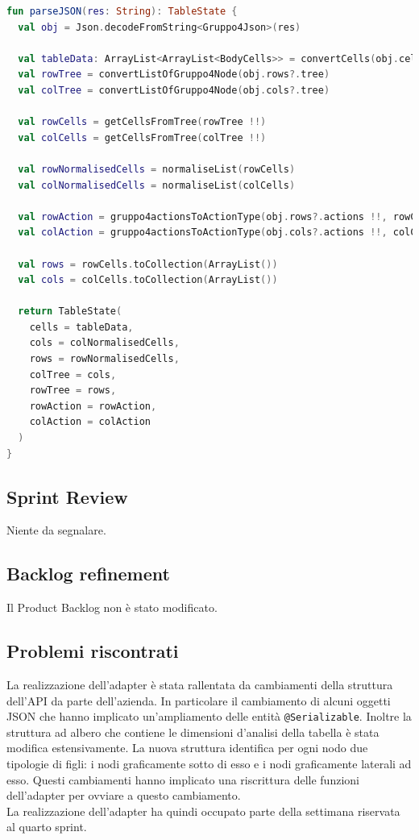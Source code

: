 \begin{lstlisting}[caption={Funzione parseJSON()}, label={lst:bodycells}, language=Kotlin]
fun parseJSON(res: String): TableState {
  val obj = Json.decodeFromString<Gruppo4Json>(res)

  val tableData: ArrayList<ArrayList<BodyCells>> = convertCells(obj.cells, obj.rows?.paths, obj.cols?.paths)!!
  val rowTree = convertListOfGruppo4Node(obj.rows?.tree)
  val colTree = convertListOfGruppo4Node(obj.cols?.tree)

  val rowCells = getCellsFromTree(rowTree !!)
  val colCells = getCellsFromTree(colTree !!)

  val rowNormalisedCells = normaliseList(rowCells)
  val colNormalisedCells = normaliseList(colCells)

  val rowAction = gruppo4actionsToActionType(obj.rows?.actions !!, rowCells.groupBy { it?.level }.size)
  val colAction = gruppo4actionsToActionType(obj.cols?.actions !!, colCells.groupBy { it?.level }.size)

  val rows = rowCells.toCollection(ArrayList())
  val cols = colCells.toCollection(ArrayList())

  return TableState(
    cells = tableData,
    cols = colNormalisedCells,
    rows = rowNormalisedCells,
    colTree = cols,
    rowTree = rows,
    rowAction = rowAction,
    colAction = colAction
  )
}
\end{lstlisting}

\subsection{Sprint Review}
Niente da segnalare.

\subsection{Backlog refinement}
Il Product Backlog non è stato modificato.

\subsection{Problemi riscontrati}
La realizzazione dell'adapter è stata rallentata da cambiamenti della struttura dell'API da parte dell'azienda. In particolare il cambiamento di alcuni oggetti JSON che hanno implicato un'ampliamento delle entità \verb|@Serializable|. Inoltre la struttura ad albero che contiene le dimensioni d'analisi della tabella è stata modifica estensivamente. La nuova struttura identifica per ogni nodo due tipologie di figli: i nodi graficamente sotto di esso e i nodi graficamente laterali ad esso. Questi cambiamenti hanno implicato una riscrittura delle funzioni dell'adapter per ovviare a questo cambiamento. \\
La realizzazione dell'adapter ha quindi occupato parte della settimana riservata al quarto sprint.

